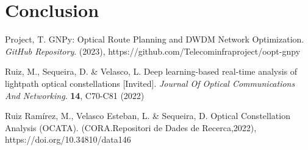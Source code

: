 \documentclass[lettersize,journal, one-column]{IEEEtran}
\begin{document}
\section{Conclusion}
\label{section:conclusion}


\begin{thebibliography}{1}


Project, T. GNPy: Optical Route Planning and DWDM Network Optimization. {\em GitHub Repository}. (2023), https://github.com/Telecominfraproject/oopt-gnpy

Ruiz, M., Sequeira, D. \& Velasco, L. Deep learning-based real-time analysis of lightpath optical constellations [Invited]. {\em Journal Of Optical Communications And Networking}. \textbf{14}, C70-C81 (2022)

Ruiz Ramírez, M., Velasco Esteban, L. \& Sequeira, D. Optical Constellation Analysis (OCATA). (CORA.Repositori de Dades de Recerca,2022), https://doi.org/10.34810/data146





\end{thebibliography}
\end{document}
